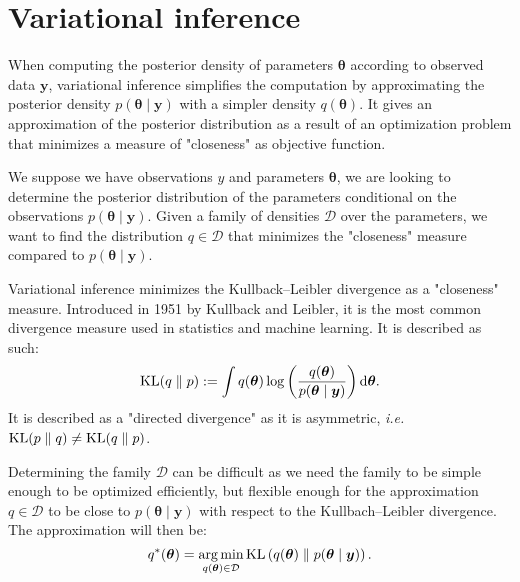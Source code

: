 \documentclass{article}
\numberwithin{equation}{section}
\DeclareMathOperator*{\argmin}{arg\,min}
\DeclareMathOperator*{\KL}{{\rm KL}}
\begin{document}
\newpage
\section{Variational inference}
When computing the posterior density of parameters $\boldsymbol{\theta}$ according to observed data $\boldsymbol{y}$, variational inference simplifies the computation by approximating the posterior density $p(\boldsymbol{\theta}\mid \boldsymbol{y})$ with a simpler density $q(\boldsymbol{\theta})$. It gives an approximation of the posterior distribution as a result of an optimization problem that minimizes a measure of "closeness" as objective function.

We suppose we have observations $y$ and parameters $\boldsymbol{\theta}$, we are looking to determine the posterior distribution of the parameters conditional on the observations $p(\boldsymbol{\theta} \mid \boldsymbol{y})$. Given a family of densities $\mathcal{D}$ over the parameters, we want to find the distribution $q \in \mathcal{D}$ that minimizes the "closeness" measure compared to $p(\boldsymbol{\theta} \mid \boldsymbol{y})$.

Variational inference minimizes the Kullback--Leibler divergence as a "closeness" measure. Introduced in 1951 by Kullback and Leibler\cite{kl51}, it is the most common divergence measure used in statistics and machine learning. It is described as such:
\begin{equation*}
\KL(q\parallel p) := \int q(\boldsymbol{\theta})\log \left(\frac{q(\boldsymbol{\theta})}{p(\boldsymbol{\theta} \mid \boldsymbol{y})}\right) \mathrm{d}\boldsymbol{\theta}.
\end{equation*} 
It is described as a "directed divergence" as it is asymmetric, \textit{i.e.} $\KL(p\parallel q) \neq \KL(q \parallel p)$.

Determining the family $\mathcal{D}$ can be difficult as we need the family to be simple enough to be optimized efficiently, but flexible enough for the approximation $q \in \mathcal{D}$ to be close to $p(\boldsymbol{\theta} \mid \boldsymbol{y})$ with respect to the Kullbach--Leibler divergence. The approximation will then be:
\begin{equation*}
q^*(\boldsymbol{\theta} ) = \argmin_{q(\boldsymbol{\theta}) \in \mathcal{D}} \KL\left( q(\boldsymbol{\theta}) \parallel p(\boldsymbol{\theta} \mid \boldsymbol{y})\right).
\end{equation*}
\end{document}
